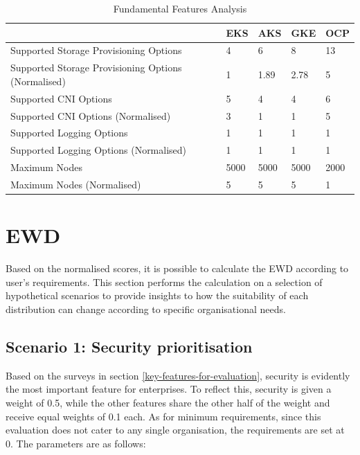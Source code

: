 \begin{table}[!ht]
    \centering
    \begin{tabular}{|p{4cm}|p{2cm}|p{2cm}|p{2cm}|p{2cm}|} %
    \hline
         & EKS & AKS & GKE & OCP \\ \hline
        Supported Storage Provisioning Options & 4& 6& 8& 13\\ \hline
        Supported Storage Provisioning Options (Normalised)& 1& 1.89& 2.78& 5\\ \hline
        Supported CNI Options& 5& 4& 4& 6\\ \hline
        Supported CNI Options (Normalised)& 3& 1& 1& 5\\ \hline
        Supported Logging Options& 1& 1& 1& 1\\ \hline
 Supported Logging Options (Normalised)& 1& 1& 1&1\\\hline
 Maximum Nodes& 5000& 5000& 5000&2000\\\hline
 Maximum Nodes (Normalised)& 5& 5& 5&1\\\hline
    \end{tabular}
    \caption{Fundamental Features Analysis} 
    \label{tab:cost-analysis}
\end{table}

\FloatBarrier

\section{EWD}

Based on the normalised scores, it is possible to calculate the EWD according to user's requirements. This section performs the calculation on a selection of hypothetical scenarios to provide insights to how the suitability of each distribution can change according to specific organisational needs.

\subsection{Scenario 1: Security prioritisation}

Based on the surveys in section \ref{key-features-for-evaluation}, security is evidently the most important feature for enterprises. To reflect this, security is given a weight of 0.5, while the other features share the other half of the weight and receive equal weights of 0.1 each. As for minimum requirements, since this evaluation does not cater to any single organisation, the requirements are set at 0. The parameters are as follows:

